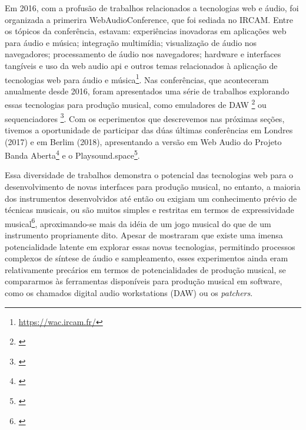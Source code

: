 Em 2016, com a profusão de trabalhos relacionados a tecnologias web e áudio, foi organizada a primerira WebAudioConference, que foi sediada no IRCAM. Entre os tópicos da conferência, estavam: experiências inovadoras em aplicações web para áudio e música; integração multimídia; visualização de áudio nos navegadores; processamento de áudio nos navegadores; hardware e interfaces tangíveis e uso da web audio api e outros temas relacionados à aplicação de tecnologias web para áudio e música\footnote{\url{https://wac.ircam.fr/}}. Nas conferências, que aconteceram anualmente desde 2016, foram apresentados uma série de trabalhos explorando essas tecnologias para produção musical, como emuladores de DAW \footnote{\cite{Jillings2017}} ou sequenciadores \footnote{\cite{Feenstra2016}}. Com os ecperimentos que descrevemos nas próximas seções, tivemos a oportunidade de participar das dúas últimas conferências em Londres (2017) e em Berlim (2018), apresentando a versão em Web Audio do Projeto Banda Aberta\footnote{\cite{Stolfi2017b}} e o Playsound.space\footnote{\cite{Stolfi2018b}}.







Essa diversidade de trabalhos demonstra o potencial das tecnologias web para o desenvolvimento de novas interfaces para produção musical, no entanto, a maioria dos instrumentos desenvolvidos até então ou exigiam um conhecimento prévio de técnicas musicais, ou são muitos simples e restritas em termos de expressividade musical\footnote{\cite{Dobrian2006}}, aproximando-se mais da idéia de um jogo musical do que de um instrumento propriamente dito. Apesar de mostraram que existe uma imensa potencialidade latente em explorar essas novas tecnologias, permitindo processos complexos de síntese de áudio e sampleamento, esses experimentos ainda eram relativamente precários em termos de potencialidades de produção musical, se compararmos às ferramentas disponíveis para produção musical em software, como os chamados digital audio workstations (DAW) ou os \emph{patchers}.


